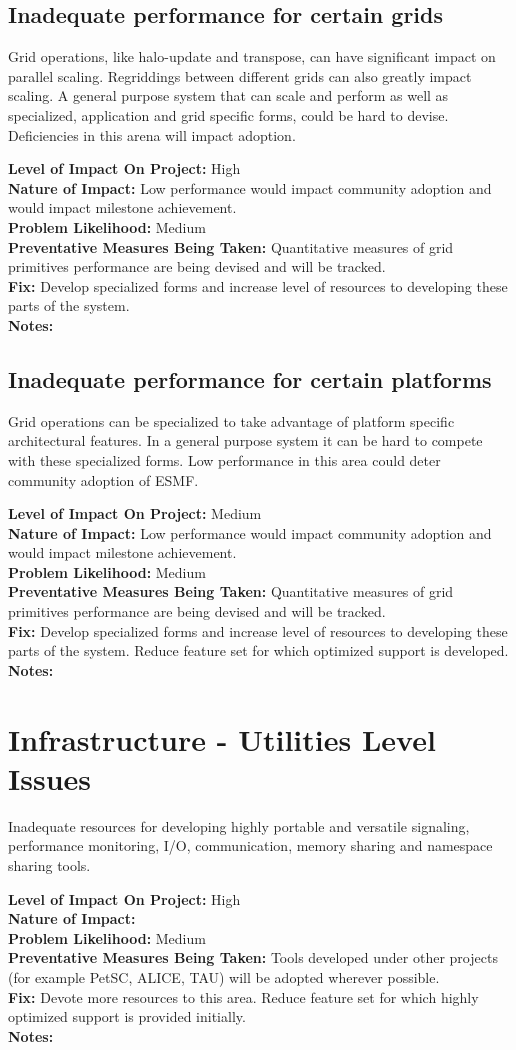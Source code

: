 \documentclass[english]{article}
\newcommand{\req}[1]{\section{\hspace{.2in}#1}}
\newcommand{\sreq}[1]{\subsection{\hspace{.2in}#1}}
\newenvironment
{reqlist}
{\begin{list} {} {} \rm \item[]}
{\end{list}}
\begin{document}
\sreq{Inadequate performance for certain grids}
Grid operations, like halo-update and transpose, can have significant impact on parallel scaling.
Regriddings between different grids can also greatly impact scaling.
A general purpose system that can scale and perform as well as specialized, application and
grid specific forms, could be hard to devise. Deficiencies in this arena will
impact adoption.
\begin{reqlist} 
{\bf Level of Impact On Project:} High \\ 
{\bf Nature of Impact:} Low performance would impact community adoption and
would impact milestone achievement.\\
{\bf Problem Likelihood:} Medium \\
{\bf Preventative Measures Being Taken:} Quantitative measures of grid primitives
performance are being devised and will be tracked.\\
{\bf Fix:} Develop specialized forms and increase level of resources
to developing these parts of the system.\\
{\bf Notes:} 
\end{reqlist}

\sreq{Inadequate performance for certain platforms}
Grid operations can be specialized to take advantage of platform specific
architectural features. In a general purpose system it can be hard to compete with these
specialized forms. Low performance in this area could deter community adoption of ESMF.
\begin{reqlist}
{\bf Level of Impact On Project:} Medium \\
{\bf Nature of Impact:} Low performance would impact community adoption and
would impact milestone achievement.\\
{\bf Problem Likelihood:} Medium \\
{\bf Preventative Measures Being Taken:} Quantitative measures of grid primitives
performance are being devised and will be tracked.\\
{\bf Fix:} Develop specialized forms and increase level of resources
to developing these parts of the system. Reduce feature set for which
optimized support is developed.
\\
{\bf Notes:} 
\end{reqlist}

\req{Infrastructure - Utilities Level Issues}
Inadequate resources for developing highly portable and versatile
signaling, performance monitoring, I/O, communication, memory sharing and namespace sharing tools.
\begin{reqlist}
{\bf Level of Impact On Project:} High \\
{\bf Nature of Impact:} \\
{\bf Problem Likelihood:} Medium \\
{\bf Preventative Measures Being Taken:} Tools developed under other projects (for example PetSC, ALICE, TAU)
will be adopted wherever possible.
\\
{\bf Fix:} Devote more resources to this area. Reduce feature set for which
highly optimized support is provided initially. \\
{\bf Notes:} 
\end{reqlist}
\end{document}
